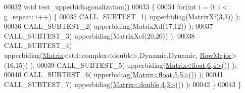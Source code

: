 \begin{DoxyCode}
00032 \textcolor{keywordtype}{void} test\_upperbidiagonalization()
00033 \{
00034   \textcolor{keywordflow}{for}(\textcolor{keywordtype}{int} i = 0; i < g\_repeat; i++) \{
00035    CALL\_SUBTEST\_1( upperbidiag(MatrixXf(3,3)) );
00036    CALL\_SUBTEST\_2( upperbidiag(MatrixXd(17,12)) );
00037    CALL\_SUBTEST\_3( upperbidiag(MatrixXcf(20,20)) );
00038    CALL\_SUBTEST\_4( upperbidiag(\hyperlink{group___core___module_class_eigen_1_1_matrix}{Matrix}<std::complex<double>,Dynamic,Dynamic,
      \hyperlink{group__enums_ggaacded1a18ae58b0f554751f6cdf9eb13acfcde9cd8677c5f7caf6bd603666aae3}{RowMajor}>(16,15)) );
00039    CALL\_SUBTEST\_5( upperbidiag(\hyperlink{group___core___module_class_eigen_1_1_matrix}{Matrix<float,6,4>}()) );
00040    CALL\_SUBTEST\_6( upperbidiag(\hyperlink{group___core___module_class_eigen_1_1_matrix}{Matrix<float,5,5>}()) );
00041    CALL\_SUBTEST\_7( upperbidiag(\hyperlink{group___core___module_class_eigen_1_1_matrix}{Matrix<double,4,3>}()) );
00042   \}
00043 \}
\end{DoxyCode}
